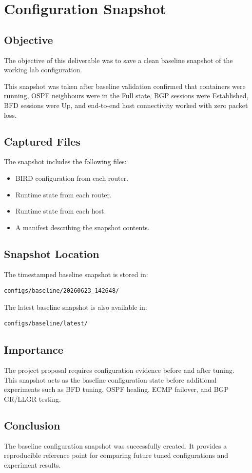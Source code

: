 \section{Configuration Snapshot}

\subsection{Objective}

The objective of this deliverable was to save a clean baseline snapshot of the working lab configuration.

This snapshot was taken after baseline validation confirmed that containers were running, OSPF neighbours were in the Full state, BGP sessions were Established, BFD sessions were Up, and end-to-end host connectivity worked with zero packet loss.

\subsection{Captured Files}

The snapshot includes the following files:

\begin{itemize}
    \item BIRD configuration from each router.
    \item Runtime state from each router.
    \item Runtime state from each host.
    \item A manifest describing the snapshot contents.
\end{itemize}

\subsection{Snapshot Location}

The timestamped baseline snapshot is stored in:

\begin{verbatim}
configs/baseline/20260623_142648/
\end{verbatim}

The latest baseline snapshot is also available in:

\begin{verbatim}
configs/baseline/latest/
\end{verbatim}

\subsection{Importance}

The project proposal requires configuration evidence before and after tuning. This snapshot acts as the baseline configuration state before additional experiments such as BFD tuning, OSPF healing, ECMP failover, and BGP GR/LLGR testing.

\subsection{Conclusion}

The baseline configuration snapshot was successfully created. It provides a reproducible reference point for comparing future tuned configurations and experiment results.
